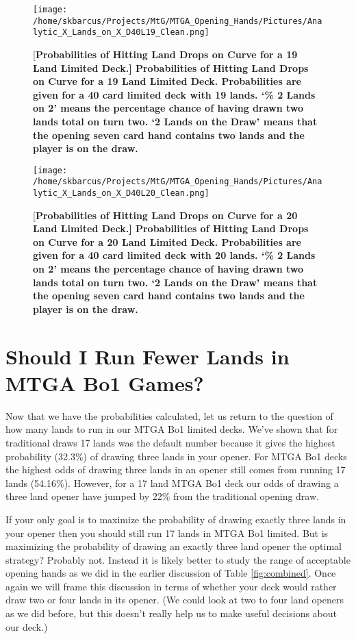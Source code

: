 \documentclass[oneside]{book}   %
\begin{document}
	\begin{figure}[!ht]
	\centering
	\centerline{\texttt{[image: /home/skbarcus/Projects/MtG/MTGA\_Opening\_Hands/Pictures/Analytic\_X\_Lands\_on\_X\_D40L19\_Clean.png]}}
	[\bf{Probabilities of Hitting Land Drops on Curve for a 19 Land Limited Deck.}]{
	{\bf{Probabilities of Hitting Land Drops on Curve for a 19 Land Limited Deck.}} Probabilities are given for a 40 card limited deck with 19 lands. `\% 2 Lands on 2' means the percentage chance of having drawn two lands total on turn two. `2 Lands on the Draw' means that the opening seven card hand contains two lands and the player is on the draw.}
	\label{fig:19_curve}
	\end{figure}	
	
	\begin{figure}[!ht]
	\centering
	\centerline{\texttt{[image: /home/skbarcus/Projects/MtG/MTGA\_Opening\_Hands/Pictures/Analytic\_X\_Lands\_on\_X\_D40L20\_Clean.png]}}
	[\bf{Probabilities of Hitting Land Drops on Curve for a 20 Land Limited Deck.}]{
	{\bf{Probabilities of Hitting Land Drops on Curve for a 20 Land Limited Deck.}} Probabilities are given for a 40 card limited deck with 20 lands. `\% 2 Lands on 2' means the percentage chance of having drawn two lands total on turn two. `2 Lands on the Draw' means that the opening seven card hand contains two lands and the player is on the draw.}
	\label{fig:20_curve}
	\end{figure}	
	
\section{Should I Run Fewer Lands in MTGA Bo1 Games?}

Now that we have the probabilities calculated, let us return to the question of how many lands to run in our MTGA Bo1 limited decks. We've shown that for traditional draws 17 lands was the default number because it gives the highest probability (32.3\%) of drawing three lands in your opener. For MTGA Bo1 decks the highest odds of drawing three lands in an opener still comes from running 17 lands (54.16\%). However, for a 17 land MTGA Bo1 deck our odds of drawing a three land opener have jumped by 22\% from the traditional opening draw. 

If your only goal is to maximize the probability of drawing exactly three lands in your opener then you should still run 17 lands in MTGA Bo1 limited. But is maximizing the probability of drawing an exactly three land opener the optimal strategy? Probably not. Instead it is likely better to study the range of acceptable opening hands as we did in the earlier discussion of Table \ref{fig:combined}. Once again we will frame this discussion in terms of whether your deck would rather draw two or four lands in its opener. (We could look at two to four land openers as we did before, but this doesn't really help us to make useful decisions about our deck.) 
\end{document}
